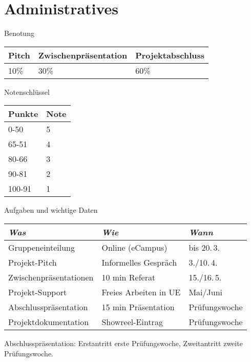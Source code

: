 
\section{Administratives}
 \frame{\sectionpage}

\begin{frame}{Benotung}

 
\begin{table}[]
\begin{tabular}{l|l|l}
Pitch & Zwischenpräsentation & Projektabschluss \\ \hline
10\%  & 30\%                & 60\%       
\end{tabular}
\end{table}



\end{frame}


\begin{frame}{Notenschlüssel}


 
\begin{table}[]
\begin{tabular}{l|l}
Punkte & Note \\ \hline
0-50   & 5    \\
65-51  & 4    \\
80-66  & 3    \\
90-81  & 2    \\
100-91 & 1   
\end{tabular}
\end{table}

\end{frame}


\begin{frame}{Aufgaben und wichtige Daten}
\begin{table}[]
\begin{tabular}{l|l|l}
\emph{Was}             &  \emph{Wie}           & \emph{Wann}	\\ \hline
Gruppeneinteilung      & Online (eCampus)      & bis 20.\,3.   \\
Projekt-Pitch          & Informelles Gespräch  & 3./10.\,4.	\\
Zwischenpräsentationen & 10 min Referat        & 15./16.\,5.	\\
Projekt-Support        & Freies Arbeiten in UE & Mai/Juni	\\
Abschlusspräsentation  & 15 min Präsentation   & Prüfungswoche \\
Projektdokumentation   & Showreel-Eintrag      & Prüfungswoche
\end{tabular}
\end{table}

Abschlusspräsentation: Erstantritt erste Prüfungswoche, Zweitantritt zweite Prüfungswoche.

\end{frame}



